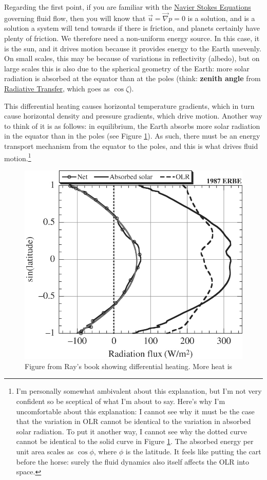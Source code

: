 Regarding the first point, if you are familiar with the \hyperref[Navier Stokes]{Navier Stokes Equations} governing fluid flow, then you will know that $\vec{u}=\vec{\nabla}p=0$ is a solution, and is a solution a system will tend towards if there is friction, and planets certainly have plenty of friction. We therefore need a non-uniform energy source. In this case, it is the sun, and it drives motion because it provides energy to the Earth unevenly. On small scales, this may be because of variations in reflectivity (albedo), but on large scales this is also due to the spherical geometry of the Earth: more solar radiation is absorbed at the equator than at the poles (think: \textbf{zenith angle} from \hyperref[Radiative Transfer]{Radiative Transfer}, which goes as $\cos\zeta$).

This differential heating causes horizontal temperature gradients, which in turn cause horizontal density and pressure gradients, which drive motion. Another way to think of it is as follows: in equilibrium, the Earth absorbs more solar radiation in the equator than in the poles (see Figure \ref{Diff Heating}). As such, there must be an energy transport mechanism from the equator to the poles, and this is what drives fluid motion.\footnote{
    I'm personally somewhat ambivalent about this explanation, but I'm not very confident so be sceptical of what I'm about to say. Here's why I'm uncomfortable about this explanation: I cannot see why it must be the case that the variation in OLR cannot be identical to the variation in absorbed solar radiation. To put it another way, I cannot see why the dotted curve cannot be identical to the solid curve in Figure \ref{Diff Heating}. The absorbed energy per unit area scales as $\cos\phi$, where $\phi$ is the latitude. It feels like putting the cart before the horse: surely the fluid dynamics also itself affects the OLR into space.
}

\begin{figure}[H]
    \centering
    \includegraphics[width=0.5\linewidth]{Figures/GFD/Diff Heating.jpg}
    \caption{Figure from Ray's book showing differential heating. More heat is }
    \label{Diff Heating}
\end{figure}

